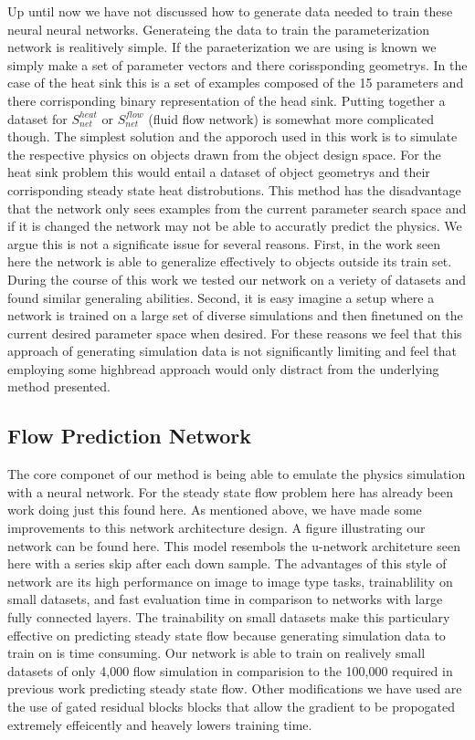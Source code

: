 \documentclass{article} %
\begin{document}
Up until now we have not discussed how to generate data needed to train these neural neural networks. Generateing the data to train the parameterization network is realitively simple. If the paraeterization we are using is known we simply make a set of parameter vectors and there corissponding geometrys. In the case of the heat sink this is a set of examples composed of the 15 parameters and there corrisponding binary representation of the head sink. Putting together a dataset for $S^{heat}_{net}$ or $S^{flow}_{net}$ (fluid flow network) is somewhat more complicated though. The simplest solution and the apporoch used in this work is to simulate the respective physics on objects drawn from the object design space. For the heat sink problem this would entail a dataset of object geometrys and their corrisponding steady state heat distrobutions. This method has the disadvantage that the network only sees examples from the current parameter search space and if it is changed the network may not be able to accuratly predict the physics. We argue this is not a significate issue for several reasons. First, in the work seen here the network is able to generalize effectively to objects outside its train set. During the course of this work we tested our network on a veriety of datasets and found similar generaling abilities. Second, it is easy imagine a setup where a network is trained on a large set of diverse simulations and then finetuned on the current desired parameter space when desired. For these reasons we feel that this approach of generating simulation data is not significantly limiting and feel that employing some highbread approach would only distract from the underlying method presented.

\subsection{Flow Prediction Network}

The core componet of our method is being able to emulate the physics simulation with a neural network. For the steady state flow problem here has already been work doing just this found here. As mentioned above, we have made some improvements to this network architecture design. A figure illustrating our network can be found here. This model resembols the u-network architeture seen here with a series skip after each down sample. The advantages of this style of network are its high performance on image to image type tasks, trainablility on small datasets, and fast evaluation time in comparison to networks with large fully connected layers. The trainability on small datasets make this particulary effective on predicting steady state flow because generating simulation data to train on is time consuming. Our network is able to train on realively small datasets of only 4,000 flow simulation in comparision to the 100,000 required in previous work predicting steady state flow. Other modifications we have used are the use of gated residual blocks blocks that allow the gradient to be propogated extremely effeicently and heavely lowers training time.
\end{document}

